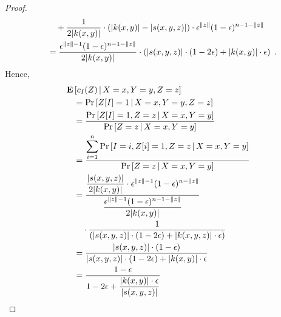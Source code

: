 \begin{proof}
\begin{align*}
& \qquad + \frac{1}{2|k(x,y)|} \cdot (|k(x,y)| - |s(x,y,z)|) \cdot \epsilon^{\left\| z \right\|} (1 - \epsilon)^{n - 1 - \left\| z \right\|} \\
& \quad = \frac{\epsilon^{\left\| z \right\| - 1} (1 - \epsilon)^{n - 1 - \left\| z \right\|}}{2|k(x,y)|} \cdot \left( |s(x,y,z)| \cdot (1 - 2\epsilon) + |k(x,y)| \cdot \epsilon \right) \; .
\end{align*}
Hence,
\begin{align*}
& \operatorname{\mathbf{E}}\left[ c_I(Z) \, \middle| \, X = x, Y = y, Z = z \right] \\
& \quad = \Pr \left[ Z[I] = 1 \, \middle| \, X = x, Y = y, Z = z \right] \\
& \quad = \frac{\displaystyle \Pr \left[ Z[I] = 1, Z = z \, \middle| \, X = x, Y = y \right]}{\displaystyle \Pr \left[ Z = z \, \middle| \, X = x, Y = y \right]} \\
& \quad = \frac{\displaystyle \sum_{i=1}^n \Pr \left[ I = i, Z[i] = 1, Z = z \, \middle| \, X = x, Y = y \right]}{\displaystyle \Pr \left[ Z = z \, \middle| \, X = x, Y = y \right]} \\
& \quad = \frac{\displaystyle \frac{|s(x,y,z)|}{2|k(x,y)|} \cdot \epsilon^{\left\| z \right\| - 1} (1 - \epsilon)^{n - \left\| z \right\|}}{\displaystyle \frac{\epsilon^{\left\| z \right\| - 1} (1 - \epsilon)^{n - 1 - \left\| z \right\|}}{2|k(x,y)|}} \\
& \qquad \cdot \frac{1}{\left( |s(x,y,z)| \cdot (1 - 2\epsilon) + |k(x,y,z)| \cdot \epsilon \right) } \\
& \quad = \frac{\displaystyle |s(x,y,z)| \cdot (1 - \epsilon)}{\displaystyle |s(x,y,z)| \cdot (1 - 2\epsilon) + |k(x,y)| \cdot \epsilon } \\
& \quad = \frac{\displaystyle 1 - \epsilon}{\displaystyle 1 - 2\epsilon + \frac{|k(x,y)| \cdot \epsilon}{|s(x,y,z)|}} \\
\end{align*}


\end{proof}
